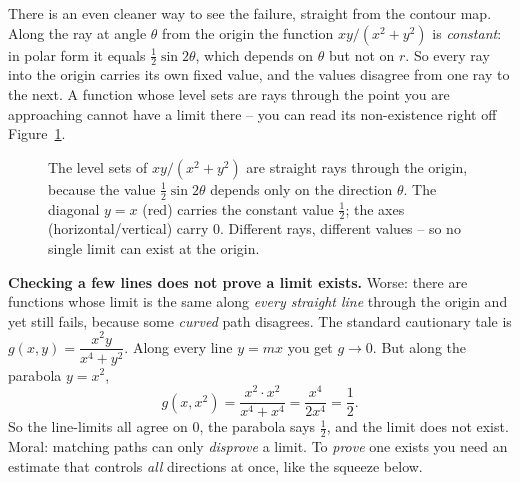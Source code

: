 There is an even cleaner way to see the failure, straight from the contour map. Along the ray
at angle $\theta$ from the origin the function $xy/(x^2+y^2)$ is \emph{constant}: in polar form
it equals $\tfrac12\sin 2\theta$, which depends on $\theta$ but not on $r$. So every ray into
the origin carries its own fixed value, and the values disagree from one ray to the next.
A function whose level sets are rays through the point you are approaching cannot have a limit
there -- you can read its non-existence right off Figure~\ref{ch32:fig-twopath-contour}.

\begin{figure}[H]
\centering
{}
\caption{The level sets of $xy/(x^2+y^2)$ are straight rays through the origin, because the
value $\tfrac12\sin 2\theta$ depends only on the direction $\theta$. The diagonal $y=x$ (red)
carries the constant value $\tfrac12$; the axes (horizontal/vertical) carry $0$. Different rays,
different values -- so no single limit can exist at the origin.}
\label{ch32:fig-twopath-contour}
\end{figure}

\begin{trapbox}
\textbf{Checking a few lines does not prove a limit exists.} Worse: there are functions whose
limit is the same along \emph{every straight line} through the origin and yet still fails,
because some \emph{curved} path disagrees. The standard cautionary tale is
$g(x,y)=\dfrac{x^2 y}{x^4+y^2}$. Along every line $y=mx$ you get
$g \to 0$. But along the parabola $y=x^2$,
\[
   g(x,x^2) = \frac{x^2\cdot x^2}{x^4 + x^4} = \frac{x^4}{2x^4} = \frac12 .
\]
So the line-limits all agree on $0$, the parabola says $\tfrac12$, and the limit does not
exist. Moral: matching paths can only \emph{disprove} a limit. To \emph{prove} one exists you
need an estimate that controls \emph{all} directions at once, like the squeeze below.
\end{trapbox}

